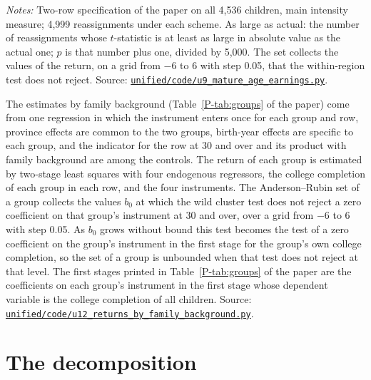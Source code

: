 \documentclass[11pt]{article}
\numberwithin{equation}{section}
\newcommand{\repourl}{https://github.com/JiachenJin1001/before-the-labor-market-or-inside-it}
\newcommand{\code}[1]{\href{\repourl/blob/main/#1}{\nolinkurl{#1}}}
\begin{document}
\begin{table}[H]
\centering
\small
\caption{Randomization inference for the earnings reduced form, the first stage, and the return to college.}
\label{oatab:randomization}
\setlength{\tabcolsep}{4pt}
\resizebox{\ifdim\width>\textwidth\textwidth\else\width\fi}{!}{}
\par\smallskip
\begin{minipage}{0.94\textwidth}
\footnotesize\emph{Notes:} Two-row specification of the paper on all 4,536 children, main intensity measure; 4,999 reassignments under each scheme. As large as actual: the number of reassignments whose $t$-statistic is at least as large in absolute value as the actual one; $p$ is that number plus one, divided by 5,000. The set collects the values of the return, on a grid from $-6$ to 6 with step 0.05, that the within-region test does not reject. Source: \code{unified/code/u9_mature_age_earnings.py}.
\end{minipage}
\end{table}

The estimates by family background (Table~\ref{P-tab:groups} of the paper) come from one regression
in which the instrument enters once for each group and row, province effects are
common to the two groups, birth-year effects are specific to each
group, and the indicator for the row at 30 and over and its product
with family background are among the controls. The return of each group is estimated by two-stage least squares
with four endogenous regressors, the college completion of each group in each row,
and the four instruments. The Anderson--Rubin set of a group collects
the values $b_0$ at which the wild cluster test does not reject a zero
coefficient on that group's instrument at 30 and over, over a grid from $-6$ to 6 with step
0.05. As $b_0$ grows without bound this test becomes the test of a zero coefficient on the group's instrument in the first stage for the group's own college completion, so the set of a group is unbounded when that test does not reject at that level. The first stages printed in Table~\ref{P-tab:groups} of the paper are the coefficients on each group's instrument in the first stage whose dependent variable is the college completion of all children. Source: \code{unified/code/u12_returns_by_family_background.py}.



\section{The decomposition}
\label{oa:decomposition}
\end{document}
